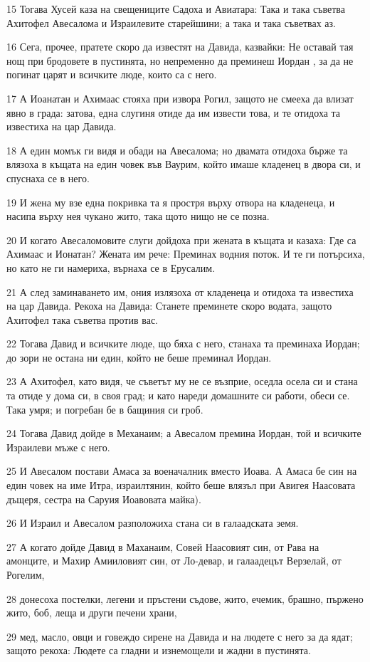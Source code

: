 \par 15 Тогава Хусей каза на свещениците Садоха и Авиатара: Така и така съветва Ахитофел Авесалома и Израилевите старейшини; а така и така съветвах аз.
\par 16 Сега, прочее, пратете скоро да известят на Давида, казвайки: Не оставай тая нощ при бродовете в пустинята, но непременно да преминеш Иордан , за да не погинат царят и всичките люде, които са с него.
\par 17 А Иоанатан и Ахимаас стояха при извора Рогил, защото не смееха да влизат явно в града: затова, една слугиня отиде да им извести това, и те отидоха та известиха на цар Давида.
\par 18 А един момък ги видя и обади на Авесалома; но двамата отидоха бърже та влязоха в къщата на един човек във Ваурим, който имаше кладенец в двора си, и спуснаха се в него.
\par 19 И жена му взе една покривка та я простря върху отвора на кладенеца, и насипа върху нея чукано жито, така щото нищо не се позна.
\par 20 И когато Авесаломовите слуги дойдоха при жената в къщата и казаха: Где са Ахимаас и Ионатан? Жената им рече: Преминах водния поток. И те ги потърсиха, но като не ги намериха, върнаха се в Ерусалим.
\par 21 А след заминаването им, ония излязоха от кладенеца и отидоха та известиха на цар Давида. Рекоха на Давида: Станете преминете скоро водата, защото Ахитофел така съветва против вас.
\par 22 Тогава Давид и всичките люде, що бяха с него, станаха та преминаха Иордан; до зори не остана ни един, който не беше преминал Иордан.
\par 23 А Ахитофел, като видя, че съветът му не се възприе, оседла осела си и стана та отиде у дома си, в своя град; и като нареди домашните си работи, обеси се. Така умря; и погребан бе в бащиния си гроб.
\par 24 Тогава Давид дойде в Механаим; а Авесалом премина Иордан, той и всичките Израилеви мъже с него.
\par 25 И Авесалом постави Амаса за военачалник вместо Иоава. А Амаса бе син на един човек на име Итра, израилтянин, който беше влязъл при Авигея Наасовата дъщеря, сестра на Саруия Иоавовата майка).
\par 26 И Израил и Авесалом разположиха стана си в галаадската земя.
\par 27 А когато дойде Давид в Маханаим, Совей Наасовият син, от Рава на амонците, и Махир Амииловият син, от Ло-девар, и галаадецът Верзелай, от Рогелим,
\par 28 донесоха постелки, легени и пръстени съдове, жито, ечемик, брашно, пържено жито, боб, леща и други печени храни,
\par 29 мед, масло, овци и говеждо сирене на Давида и на людете с него за да ядат; защото рекоха: Людете са гладни и изнемощели и жадни в пустинята.

